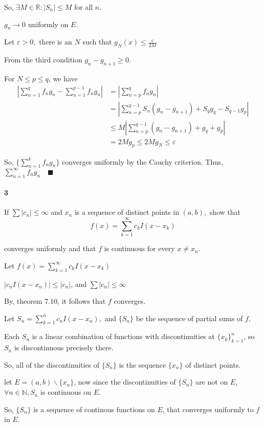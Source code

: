 \documentclass{article}
\newcommand\N{\mathbb{N}}
\newcommand\R{\mathbb{R}}
\begin{document}
So, $\exists M\in \R: |S_n|\leq M$ for all $n$.

$g_n\rightarrow 0$ uniformly  on $E$.

Let $\varepsilon > 0,$ there is an $N$ such that $g_N(x) \leq \frac{\varepsilon}{2M}$

From the third condition $g_n -g_{n+1}\geq 0$.

For $N \leq p \leq q$, we have
\begin{align*}
  \left| \sum_{n=1}^q f_n g_n - \sum_{n=1}^{p-1} f_ng_n \right|
  &= \left|\sum_{n=p}^q f_n g_n \right|\\
                  &= \left|\sum_{n=p}^{q-1}S_n(g_n - g_{n+1}) + S_qg_q -
                       S_{q-1}g_p\right| \\
  &\leq M \left|\sum_{n=p}^{q-1}(g_n - g_{n+1}) + g_q +
    g_p\right|\\
  &= 2Mg_p \leq 2Mg_{N}\leq \varepsilon
\end{align*}

So, $\{\sum_{n=1}^kf_ng_n\}$ converges uniformly by the Cauchy criterion.
Thus, $\sum_{n=1}^\infty f_ng_n \quad \blacksquare$

\paragraph{3} If $\sum |c_n| \leq \infty$ and $x_n$ is a sequence of
distinct points in $(a,b),$ show that
$$f(x) = \sum_{k=1}^\infty c_kI(x-x_k)$$

converges uniformly and that $f$ is continuous for every $x \neq x_n$.


Let $f(x) = \sum_{k=1}^\infty c_kI(x-x_k)$

$|c_nI(x-x_n)| \leq |c_n|$, and $\sum |c_n| \leq \infty$

By, theorem $7.10$, it follows that $f$ converges.

Let $S_n = \sum_{k=1}^n c_n I(x-x_n),$ and $\{S_n\}$ be the sequence
of partial sums of $f$.

Each $S_n$ is a linear combination of functions with discontinuities at
$\{x_k\}_{k=1}^n$, so $S_n$ is discontinuous precisely there.

So, all of the discontinuities of $\{S_n\}$ is the sequence $\{x_n\}$
of distinct points.

let $E = (a,b)\backslash \{x_n\}$, now since the discontinuities of
$\{S_n\}$ are not on $E$, $\forall n\in \N, S_n$ is continuous on $E$.

So, $\{S_n\}$ is a sequence of continous functions on $E$, that
converges uniformly to $f$ in $E$.
\end{document}
